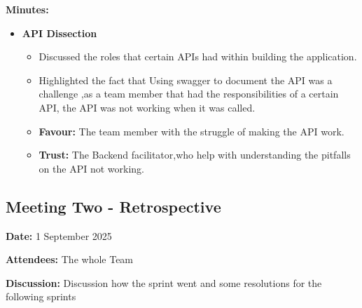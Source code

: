 \textbf{Minutes:}
\begin{itemize}
    \item \textbf{API Dissection}
    \begin{itemize}
        \item Discussed the roles that certain APIs had within building the application. 
        \item Highlighted the fact that Using swagger to document the API was a challenge ,as a team member that had the responsibilities of a certain API, the API was not working when it was called.
        \item \textbf{Favour:} The team member with the struggle of making the API work.
        \item \textbf{Trust:} The Backend facilitator,who help with understanding the pitfalls on the API not working.
    \end{itemize}
\end{itemize}
    

\subsection{Meeting Two - Retrospective}
\textbf{Date:} 1 September 2025 \par
\textbf{Attendees:} The whole Team  \par
\textbf{Discussion:} Discussion how the sprint went and some resolutions for the following sprints \par

